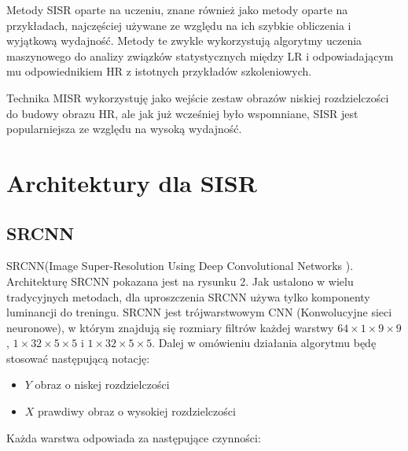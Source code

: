 \documentclass[a4paper,11pt, notitlepage ]{article}
\begin{document}
	 Metody SISR oparte na uczeniu, znane również jako metody oparte na przykładach, najczęściej używane ze względu na ich szybkie obliczenia i wyjątkową wydajność. Metody te zwykle wykorzystują algorytmy uczenia maszynowego do analizy związków statystycznych między LR i odpowiadającym mu odpowiednikiem HR z istotnych przykładów szkoleniowych.
	 
	 Technika MISR wykorzystuję jako wejście zestaw obrazów niskiej rozdzielczości do budowy obrazu HR, ale jak już wcześniej było wspomniane, SISR jest popularniejsza ze względu na wysoką wydajność.
	 \newpage
	 \section{Architektury dla SISR}
	 \subsection{SRCNN}
	 SRCNN(Image Super-Resolution Using Deep Convolutional Networks
	 ). Architekturę SRCNN pokazana jest na rysunku 2. Jak ustalono w wielu tradycyjnych metodach, dla uproszczenia SRCNN używa tylko komponenty luminancji do treningu. SRCNN jest trójwarstwowym CNN (Konwolucyjne sieci neuronowe), w którym znajdują się rozmiary filtrów każdej warstwy $64 \times 1 \times 9 \times 9$, $1 \times 32 \times 5 \times 5$ i $1 \times 32 \times 5 \times 5$. Dalej w omówieniu działania algorytmu będę stosować następującą notację:
	 \begin{itemize}
	 	\item $Y$ obraz o niskej rozdzielczości
	 	\item $X$ prawdiwy obraz o wysokiej rozdzielczości  
	 \end{itemize}
	 Każda warstwa odpowiada za następujące czynności:
\end{document}
